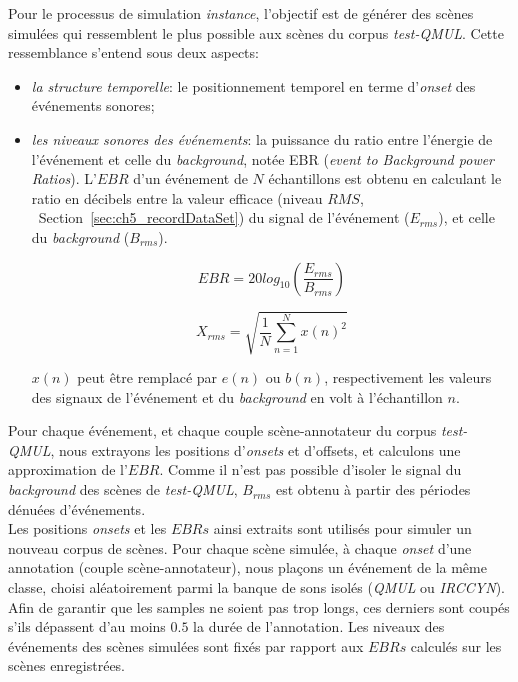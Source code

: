 Pour le processus de simulation \emph{instance}, l'objectif est de générer des scènes simulées qui ressemblent le plus possible aux scènes du corpus \emph{test-QMUL}. Cette ressemblance s'entend sous deux aspects:

\begin{itemize}
\item \emph{la structure temporelle}: le positionnement temporel en terme d'\emph{onset} des événements sonores;
\item \emph{les niveaux sonores des événements}: la puissance du ratio entre l'énergie de l'événement et celle du \emph{background}, notée EBR (\emph{event to Background power Ratios}). L'$EBR$ d'un événement de $N$ échantillons est obtenu en calculant le ratio en décibels entre la valeur efficace (niveau $RMS$, \cf~Section~\ref{sec:ch5_recordDataSet}) du signal de l'événement ($E_{rms}$), et celle du \emph{background}  ($B_{rms}$).

\begin{equation}
\label{eq:ch7_eq1}
EBR=20log_{10} \left(  \dfrac{E_{rms}}{B_{rms}} \right) 
\end{equation}

\begin{equation}
\label{eq:ch7_eq2}
X_{rms}=\sqrt{\dfrac{1}{N} \sum_{n=1}^{N} x(n)^2}
\end{equation}

$x(n)$ peut être remplacé par $e(n)$ ou $b(n)$, respectivement les valeurs des signaux de l'événement et du \emph{background} en volt à l'échantillon $n$. 
\end{itemize}

Pour chaque événement, et chaque couple scène-annotateur du corpus \emph{test-QMUL}, nous extrayons les positions d'\emph{onsets} et d'{offsets}, et calculons une approximation de l'$EBR$. Comme il n'est pas possible d'isoler le signal du \emph{background} des scènes de \emph{test-QMUL}, $B_{rms}$ est obtenu à partir des périodes dénuées d'événements. \\
 

Les positions \emph{onsets} et les $EBRs$ ainsi extraits sont utilisés pour simuler un nouveau corpus de scènes. Pour chaque scène simulée, à chaque \emph{onset} d'une annotation (couple scène-annotateur), nous plaçons un événement de la même classe, choisi aléatoirement parmi la banque de sons isolés (\emph{QMUL} ou \emph{IRCCYN}). Afin de garantir que les samples ne soient pas trop longs, ces derniers sont coupés s'ils dépassent d'au moins $0.5$ la durée de l'annotation. Les niveaux des événements des scènes simulées sont fixés par rapport aux $EBRs$ calculés sur les scènes enregistrées. 

